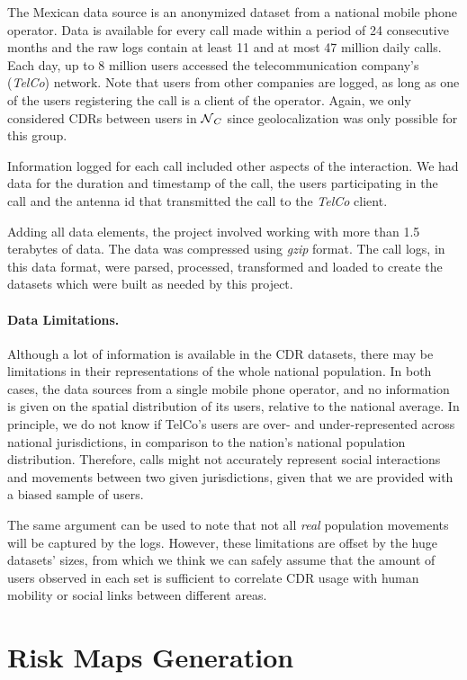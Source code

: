 The Mexican data source is an anonymized dataset from a national mobile phone operator.
Data is available for every call made within a period of 24 consecutive months and the raw logs contain at least 11 and at most 47 million daily calls.
Each day, up to 8 million users accessed the telecommunication company's (\textit{TelCo}) network.
Note that users from other companies are logged, as long as one of the users registering the call is a client of the operator.
Again, we only considered CDRs between users in $\operatorname{\mathcal{N}}_C$ since geolocalization was only possible for this group.

Information logged for each call included other aspects of the interaction.
We had data for the duration and timestamp of the call, the users participating in the call and the antenna id that transmitted the call to the \emph{TelCo} client.

Adding all data elements, the project involved working with more than 1.5 terabytes of data.
The data was compressed using \emph{gzip} format.
The call logs, in this data format, were parsed, processed, transformed and loaded to create the datasets which were built as needed by this project.

\paragraph{Data Limitations.}
Although a lot of information is available in the CDR datasets, there may be limitations in their representations of the whole national population.
In both cases, the data sources from a single mobile phone operator, and no information is given on the spatial distribution of its users, relative to the national average.
In principle, we do not know if TelCo's users are over- and under-represented across national jurisdictions, in comparison to the nation's national population distribution.
Therefore, calls might not accurately represent social interactions and movements between two given jurisdictions, given that we are provided with a biased sample of users.

The same argument can be used to note that not all \textit{real} population movements will be captured by the logs.
However, these limitations are offset by the huge datasets' sizes, from which we think we can safely assume that the amount of users observed in each set is sufficient to correlate CDR usage with human mobility or social links between different areas.

\section{ Risk Maps Generation}\label{section:risk_maps}

